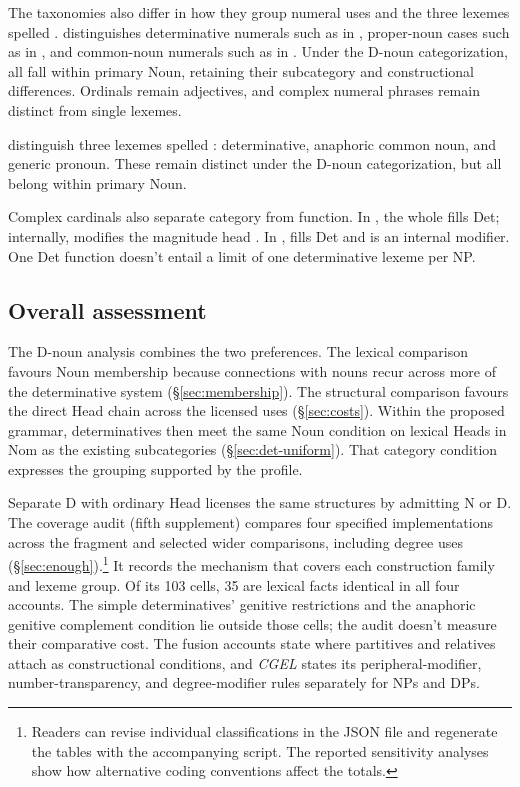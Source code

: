 \documentclass[12pt]{article}
\begin{document}
The taxonomies also differ in how they group numeral uses and the three lexemes spelled . \textcite{reynolds2026numerals} distinguishes determinative numerals such as  in , proper-noun cases such as  in , and common-noun numerals such as  in . Under the D-noun categorization, all fall within primary Noun, retaining their subcategory and constructional differences. Ordinals remain adjectives, and complex numeral phrases remain distinct from single lexemes.

\textcite[797--798]{payne2013anaphoric} distinguish three lexemes spelled : determinative, anaphoric common noun, and generic pronoun. These remain distinct under the D-noun categorization, but all belong within primary Noun.

Complex cardinals also separate category from function. In , the whole  fills Det; internally,  modifies the magnitude head  \citep[§4]{reynolds2026numerals}. In ,  fills Det and  is an internal modifier. One Det function doesn't entail a limit of one determinative lexeme per NP.

\subsection{Overall assessment}\label{sec:overall-assessment}

The D-noun analysis combines the two preferences. The lexical comparison favours Noun membership because connections with nouns recur across more of the determinative system (§\ref{sec:membership}). The structural comparison favours the direct Head chain across the licensed uses (§\ref{sec:costs}). Within the proposed grammar, determinatives then meet the same Noun condition on lexical Heads in Nom as the existing subcategories (§\ref{sec:det-uniform}). That category condition expresses the grouping supported by the profile.

Separate D with ordinary Head licenses the same structures by admitting N or D. The coverage audit (fifth supplement) compares four specified implementations across the fragment and selected wider comparisons, including degree uses (§\ref{sec:enough}).\footnote{Readers can revise individual classifications in the JSON file and regenerate the tables with the accompanying script. The reported sensitivity analyses show how alternative coding conventions affect the totals.} It records the mechanism that covers each construction family and lexeme group. Of its 103 cells, 35 are lexical facts identical in all four accounts. The simple determinatives' genitive restrictions and the anaphoric genitive complement condition lie outside those cells; the audit doesn't measure their comparative cost. The fusion accounts state where partitives and relatives attach as constructional conditions, and \textit{CGEL} states its peripheral-modifier, number-transparency, and degree-modifier rules separately for NPs and DPs.
\end{document}
